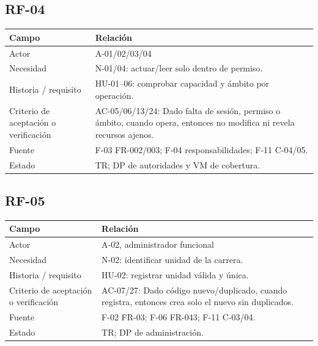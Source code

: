 \documentclass[12pt,a4paper]{report}
\begin{document}
\subsection{RF-04}\label{matriz-RF-04}

{\def\LTcaptype{none} %
\begin{longtable}[]{@{}
  >{\raggedright\arraybackslash}p{}
  >{\raggedright\arraybackslash}p{}@{}}
\toprule\noalign{}
\begin{minipage}[b]{\linewidth}\raggedright
Campo
\end{minipage} & \begin{minipage}[b]{\linewidth}\raggedright
Relación
\end{minipage} \\
\midrule\noalign{}
\endhead
\bottomrule\noalign{}
\endlastfoot
Actor & A-01/02/03/04 \\
Necesidad & N-01/04: actuar/leer solo dentro de permiso. \\
Historia / requisito & HU-01--06: comprobar capacidad y ámbito por
operación. \\
Criterio de aceptación o verificación & AC-05/06/13/24: Dado falta de
sesión, permiso o ámbito, cuando opera, entonces no modifica ni revela
recursos ajenos. \\
Fuente & F-03 FR-002/003; F-04 responsabilidades; F-11 C-04/05. \\
Estado & TR; DP de autoridades y VM de cobertura. \\
\end{longtable}
}

\subsection{RF-05}\label{matriz-RF-05}

{\def\LTcaptype{none} %
\begin{longtable}[]{@{}
  >{\raggedright\arraybackslash}p{}
  >{\raggedright\arraybackslash}p{}@{}}
\toprule\noalign{}
\begin{minipage}[b]{\linewidth}\raggedright
Campo
\end{minipage} & \begin{minipage}[b]{\linewidth}\raggedright
Relación
\end{minipage} \\
\midrule\noalign{}
\endhead
\bottomrule\noalign{}
\endlastfoot
Actor & A-02, administrador funcional \\
Necesidad & N-02: identificar unidad de la carrera. \\
Historia / requisito & HU-02: registrar unidad válida y única. \\
Criterio de aceptación o verificación & AC-07/27: Dado código
nuevo/duplicado, cuando registra, entonces crea solo el nuevo sin
duplicados. \\
Fuente & F-02 FR-03; F-06 FR-043; F-11 C-03/04. \\
Estado & TR; DP de administración. \\
\end{longtable}
}
\end{document}
